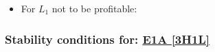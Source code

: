 \begin{itemize}
\begin{itemize}
		\item For $L_1$ not to be profitable:


	\end{itemize}

\end{itemize}



\subsubsection{Stability conditions for: \hyperref[apx:E1A:3H1L]{E1A [3H1L]}}
\label{apx:E1A:3H1L_stability_cond}

